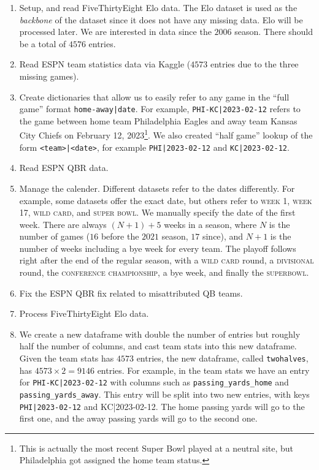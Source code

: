 \documentclass[10pt]{article}
\begin{document}
\begin{enumerate}

\item Setup, and read FiveThirtyEight Elo data. The Elo dataset is used as the
{\em backbone} of the dataset since it does not have any missing data. Elo will be
processed later. We are interested in data since the $2006$ season. There should be a total
of $4576$ entries.

\item Read ESPN team statistics data via Kaggle ($4573$ entries due to the three
missing games).

\item Create dictionaries that allow us to easily refer to any game in 
the ``full game'' format \texttt{home-away|date}. For example,
\texttt{PHI-KC|2023-02-12} refers to the game between home team Philadelphia Eagles and
away team Kansas City Chiefs on February 12, 2023\footnote{This is actually
the most recent Super Bowl played at a neutral site, but Philadelphia got assigned
the home team status.}. We also created ``half game'' lookup of
the form \texttt{<team>|<date>}, for example \texttt{PHI|2023-02-12} and 
\texttt{KC|2023-02-12}.

\item Read ESPN QBR data.

\item Manage the calender. Different datasets refer to the dates differently. For example,
some datasets offer the exact date, but others refer to \textsc{week 1},
\textsc{week 17}, \textsc{wild card}, and \textsc{super bowl}. We manually specify the
date of the first week. There are always $(N+1) + 5$ weeks in a season, where $N$ is the
number of games ($16$ before the $2021$ season, $17$ since), and $N+1$ is the number of
weeks including a bye week for every team. The playoff follows right after the end of the
regular season, with a \textsc{wild card} round, a \textsc{divisional} round, the
\textsc{conference championship}, a bye week, and finally the \textsc{superbowl}.

\item Fix the ESPN QBR fix related to misattributed QB teams.

\item Process FiveThirtyEight Elo data.

\item We create a new dataframe with double the number
of entries but roughly half the number of columns, and cast team stats into this new
dataframe. Given the team stats has $4573$ entries, the new dataframe, called
\texttt{twohalves}, has $4573\times 2 = 9146$ entries.
For example, in the team stats we have an
   entry for \texttt{PHI-KC|2023-02-12} with columns such as \texttt{passing\_yards\_home}
   and \texttt{passing\_yards\_away}. This entry will be split into two new entries, with keys
\texttt{PHI|2023-02-12} and \textsc{KC|2023-02-12}. The home passing yards will go to the
first one, and the away passing yards will go to the second one.


\end{enumerate}
\end{document}
